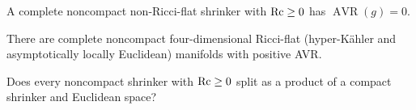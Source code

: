 \begin{theorem}
\label{thm:chow-iv-nonnegative-ricci-avr-zero}
A complete noncompact non-Ricci-flat shrinker with $\operatorname{Rc}\ge0$ has
$\operatorname{AVR}(g)=0$.
\end{theorem}

\begin{remark}
\label{rem:chow-iv-ricci-flat-positive-avr}
There are complete noncompact four-dimensional Ricci-flat (hyper-K\"ahler and
asymptotically locally Euclidean) manifolds with positive AVR.
\end{remark}

\begin{claim}
\label{prob:chow-iv-shrinker-splitting}
Does every noncompact shrinker with $\operatorname{Rc}\ge0$ split as a product of a compact
shrinker and Euclidean space?
\end{claim}
